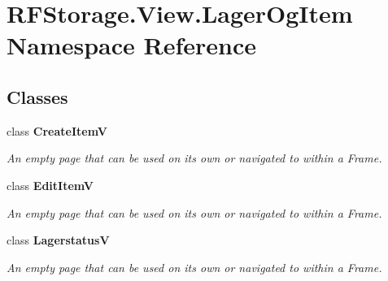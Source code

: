 \section{R\+F\+Storage.\+View.\+Lager\+Og\+Item Namespace Reference}
\label{namespace_r_f_storage_1_1_view_1_1_lager_og_item}
\subsection*{Classes}
\begin{DoxyCompactItemize}
\item 
class \textbf{ Create\+ItemV}
\begin{DoxyCompactList}\small\item\em An empty page that can be used on its own or navigated to within a Frame. \end{DoxyCompactList}\item 
class \textbf{ Edit\+ItemV}
\begin{DoxyCompactList}\small\item\em An empty page that can be used on its own or navigated to within a Frame. \end{DoxyCompactList}\item 
class \textbf{ LagerstatusV}
\begin{DoxyCompactList}\small\item\em An empty page that can be used on its own or navigated to within a Frame. \end{DoxyCompactList}\end{DoxyCompactItemize}
